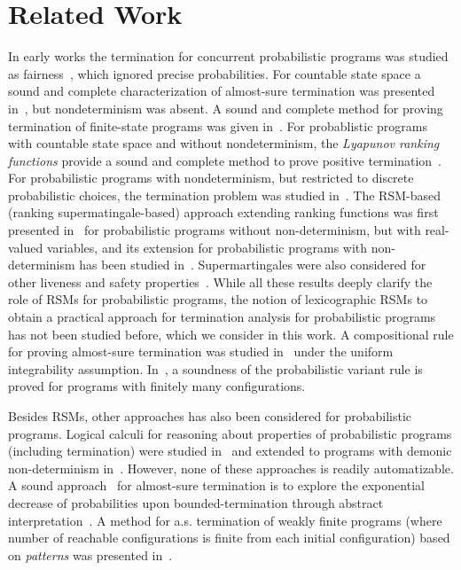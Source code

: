 
\vspace{-4em}
\section{Related Work}
\vspace{-0.5em}

{}
In early works the termination for concurrent probabilistic programs was studied 
as fairness~\cite{SPH84}, which ignored precise probabilities.
For countable state space a sound and complete characterization of almost-sure termination 
was presented in~\cite{HS85}, but nondeterminism was absent.
A sound and complete method for proving termination of finite-state programs
was given in~\cite{EGK12}.
For probablistic programs with countable state space and without 
nondeterminism, the {\em Lyapunov ranking functions} provide a sound and 
complete method to prove positive termination~\cite{BG05,Foster53}.
For probabilistic programs with nondeterminism, but restricted to discrete probabilistic
choices, the termination problem was studied 
in~\cite{MM04,MM05}.
The RSM-based (ranking supermatingale-based) approach extending ranking functions was first 
presented in~\cite{SriramCAV} for probabilistic programs without non-determinism,
but with real-valued variables, and its extension for probabilistic programs
with non-determinism has been studied 
in~\cite{HolgerPOPL,CF17,CFNH16:prob-termination,CFG16,CNZ17,MM16:proofrule-arxiv}. 
Supermartingales were also 
considered for other liveness and safety 
properties~\cite{CVS16:martingale-recurrence-persistence,BEFH16:doob}.
While all these results deeply clarify the role of RSMs for probabilistic programs, 
the notion of lexicographic RSMs to obtain a practical approach for termination 
analysis for probabilistic programs has not been studied before, which we consider in 
this work. 
%
A 
compositional rule for proving almost-sure termination was studied 
in~\cite{HolgerPOPL} under the uniform integrability assumption. 
In~\cite{MM05}, a soundness of the probabilistic variant rule is proved for 
programs with finitely many configurations.


Besides RSMs, other approaches has also been considered for probabilistic programs.
Logical calculi for reasoning about properties of 
probabilistic programs (including termination) were studied 
in~\cite{Kozen:prob-semantics,FH:prdl,Kozen:probabilistic-PDL,Feldman:propositional-probdl}
 and extended to programs with demonic non-determinism 
 in~\cite{MM04,MM05,KKMO16:wp-expected-runtime,OKKM16:recursive-prob-wp-calculus,GKI14:prob-semantics,
  DBLP:conf/sas/KatoenMMM10}. However, none of these approaches is readily 
  automatizable.
A sound approach~\cite{DBLP:conf/sas/Monniaux01} for almost-sure termination 
is to explore the exponential decrease of probabilities upon 
bounded-termination 
through abstract interpretation~\cite{DBLP:conf/popl/CousotC77}. A method for 
a.s. termination of weakly finite programs (where number of reachable 
configurations is finite from each initial configuration) based on 
\emph{patterns} was presented in~\cite{EGK12}.
 

